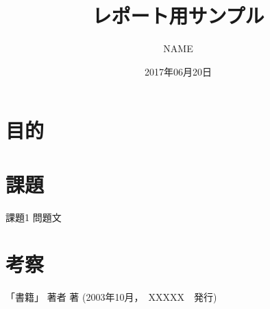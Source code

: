 \documentclass[a4j,11pt]{jsarticle}
\title{レポート用サンプル}
\date{2017年06月20日}
\author{NAME}
\begin{document}
	\maketitle
  \section{目的}

  \section{課題}
		\begin{itembox}[l]{課題1}
			問題文
		\end{itembox}

  \section{考察}

  \begin{thebibliography}{1}
  	 「書籍」 著者 著 (2003年10月，　XXXXX　発行)
  \end{thebibliography}
\end{document}
